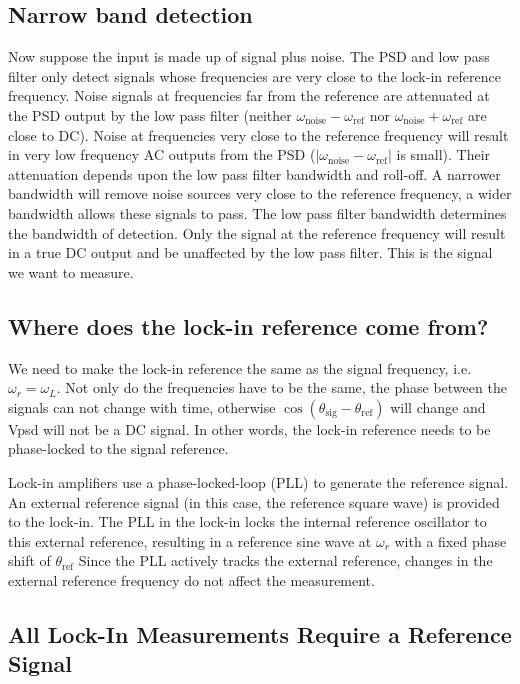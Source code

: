 \documentclass{../lab}
\begin{document}
\subsection{Narrow band detection}

Now suppose the input is made up of signal plus noise. The PSD and low pass filter only detect signals whose frequencies are very close to the lock-in reference frequency. Noise signals at frequencies far from the reference are attenuated at the PSD output by the low pass filter (neither $\omega_\text{noise} - \omega_\text{ref}$ nor $\omega_\text{noise} + \omega_\text{ref}$ are close to DC). Noise at frequencies very close to the reference frequency will result in very low frequency AC outputs from the PSD ($|\omega_\text{noise} - \omega_\text{ref}|$ is small). Their attenuation depends upon the low pass filter bandwidth and roll-off. A narrower bandwidth will remove noise sources very close to the reference frequency, a wider bandwidth allows these signals to pass. The low pass filter bandwidth determines the bandwidth of detection. Only the signal at the reference frequency will result in a true DC output and be unaffected by the low pass filter. This is the signal we want to measure.

\subsection{Where does the lock-in reference come from?}

We need to make the lock-in reference the same as the signal frequency, i.e. $\omega_r = \omega_L$. Not only do the frequencies have to be the same, the phase between the signals can not change with time, otherwise $\cos(\theta_\text{sig} - \theta_\text{ref})$ will change and Vpsd will not be a DC signal. In other words, the lock-in reference needs to be phase-locked to the signal reference.

Lock-in amplifiers use a phase-locked-loop (PLL) to generate the reference signal. An external reference signal (in this case, the reference square wave) is provided to the lock-in. The PLL in the lock-in locks the internal reference oscillator to this external reference, resulting in a reference sine wave at $\omega_r $ with a fixed phase shift of $\theta_\text{ref}$ Since the PLL actively tracks the external reference, changes in the external reference frequency do not affect the measurement.

\subsection{All Lock-In Measurements Require a Reference Signal}
\end{document}
